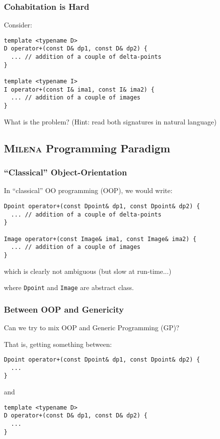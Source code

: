 \documentclass{beamer}
\newcommand{\code}[1]{{\scriptsize{\texttt{#1}}}\xspace}
\newcommand{\mln}{\textsc{Milena}\xspace}
\begin{document}
\begin{frame}[fragile]
  \frametitle{Cohabitation is Hard}

Consider:

\begin{lstlisting}
template <typename D>
D operator+(const D& dp1, const D& dp2) {
  ... // addition of a couple of delta-points
}

template <typename I>
I operator+(const I& ima1, const I& ima2) {
  ... // addition of a couple of images
}
\end{lstlisting}

What is the problem?  (Hint: read both signatures in natural language)

\end{frame}



\subsection{\mln Programming Paradigm}


\begin{frame}[fragile]
  \frametitle{``Classical'' Object-Orientation}

In ``classical'' OO programming (OOP), we would write:
\begin{lstlisting}
Dpoint operator+(const Dpoint& dp1, const Dpoint& dp2) {
  ... // addition of a couple of delta-points
}

Image operator+(const Image& ima1, const Image& ima2) {
  ... // addition of a couple of images
}
\end{lstlisting}
which is clearly not ambiguous (but slow at run-time...)

where \code{Dpoint} and \code{Image} are abstract class.

\end{frame}


\begin{frame}[fragile]
  \frametitle{Between OOP and Genericity}

Can we try to mix OOP and Generic Programming (GP)?

\medskip

That is, getting something between:

\begin{lstlisting}
Dpoint operator+(const Dpoint& dp1, const Dpoint& dp2) {
  ...
}
\end{lstlisting}
and
\begin{lstlisting}
template <typename D>
D operator+(const D& dp1, const D& dp2) {
  ...
}
\end{lstlisting}

\end{frame}
\end{document}
